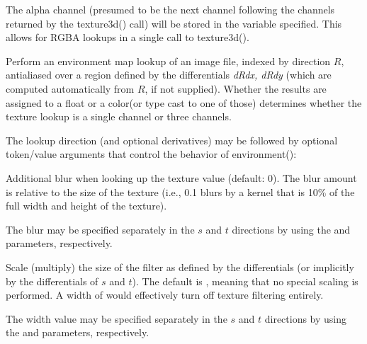 \documentclass[11pt,letterpaper]{book}
\def\color{{\cf color}\xspace}
\def\float{{\cf float}\xspace}
\begin{document}
\vspace{12pt}
The alpha channel (presumed to be the next channel following the
channels returned by the {\cf texture3d()} call) will be stored in the
variable specified.  This allows for RGBA lookups in a single call to
{\cf texture3d()}.
\apiend
\vspace{-16pt}

\apiend


Perform an environment map lookup of an image file, indexed by direction
$R$, antialiased over a region defined by the differentials
\emph{dRdx, dRdy} (which are computed
automatically from $R$, if not supplied).  Whether the results
are assigned to a \float or a \color (or type cast to one of those)
determines whether the texture lookup is a single channel or three
channels.

The lookup direction (and optional derivatives) may be followed by optional token/value
arguments that control the behavior of {\cf environment()}:

\vspace{12pt}
Additional blur when looking up the texture value (default: 0).  The
blur amount is relative to the size of the texture (i.e., 0.1 blurs by a
kernel that is 10\% of the full width and height of the texture).

The blur may be specified separately in the $s$ and $t$ directions by
using the  and  parameters, respectively.
\apiend
\vspace{-16pt}

\vspace{12pt}
Scale (multiply) the size of the filter as defined by the differentials
(or implicitly by the differentials of $s$ and $t$).  The default is
{}, meaning that no special scaling is performed.  A width of
{} would effectively turn off texture filtering entirely.

The width value may be specified separately in the $s$ and $t$
directions by using the  and  parameters,
respectively.
\apiend
\vspace{-16pt}
\end{document}
